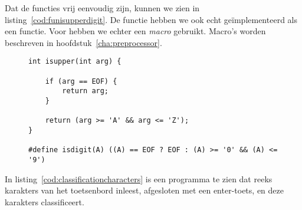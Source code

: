 Dat de functies vrij eenvoudig zijn, kunnen we zien in listing~\ref{cod:funisupperdigit}. De functie  hebben we ook echt geïmplementeerd als een functie. Voor  hebben we echter een \textsl{macro} gebruikt. Macro's worden beschreven in hoofdstuk~\ref{cha:preprocessor}.

\begin{figure}[!ht]
\begin{lstlisting}[caption=Implementatie van de functies \texttt{isupper()} en \texttt{isdigit()}.,label=cod:funisupperdigit]
int isupper(int arg) {

	if (arg == EOF) {
		return arg;
	}

	return (arg >= 'A' && arg <= 'Z');
}

#define isdigit(A) ((A) == EOF ? EOF : (A) >= '0' && (A) <= '9')
\end{lstlisting}
\end{figure}

In listing~\ref{cod:classificationcharacters} is een programma te zien dat reeks karakters van het toetsenbord inleest, afgesloten met een enter-toets, en deze karakters classificeert.

